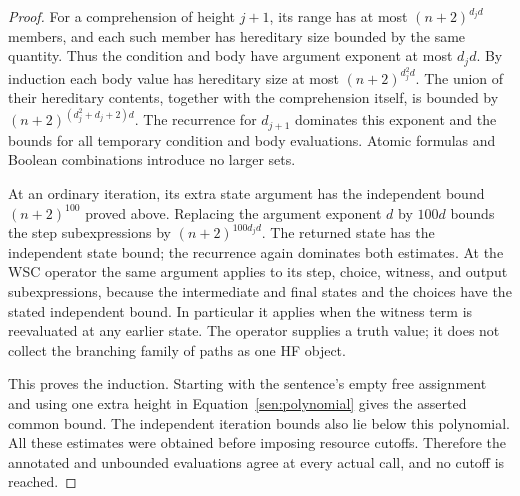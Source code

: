 \begin{proof}
For a comprehension of height \(j+1\), its range has at most
\((n+2)^{d_jd}\) members, and each such member has hereditary size
bounded by the same quantity. Thus the condition and body have
argument exponent at most \(d_jd\). By induction each body value has
hereditary size at most \((n+2)^{d_j^2d}\).
The union of their hereditary contents, together with the comprehension
itself, is bounded by
\((n+2)^{(d_j^2+d_j+2)d}\). The recurrence for \(d_{j+1}\) dominates
this exponent and the bounds for all temporary condition and body
evaluations. Atomic formulas and Boolean combinations introduce no
larger sets.

At an ordinary iteration, its extra state argument has the independent
bound \((n+2)^{100}\) proved above. Replacing the argument exponent \(d\)
by \(100d\) bounds the step subexpressions by
\((n+2)^{100d_jd}\). The returned state has the independent state bound;
the recurrence again dominates both estimates.
At the WSC operator the same argument applies to its step, choice,
witness, and output subexpressions, because the intermediate and final
states and the choices have the stated independent bound. In
particular it applies when the witness term is reevaluated at any
earlier state. The operator supplies a truth value; it does not collect
the branching family of paths as one HF object.

This proves the induction. Starting with the sentence's empty free
assignment and using one extra height in
Equation~\eqref{sen:polynomial} gives the asserted common bound.
The independent iteration bounds also lie below this polynomial.
All these estimates were obtained before imposing resource cutoffs.
Therefore the annotated and unbounded evaluations agree at every
actual call, and no cutoff is reached.
\end{proof}

